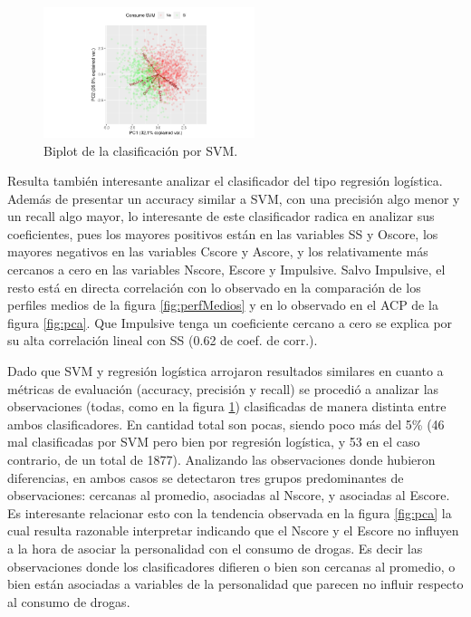 \documentclass[a4paper,twocolumn]{article}
\begin{document}
\begin{figure}[h]
	\centering
	\includegraphics[trim={4cm 0.2cm 2cm 0.5cm}, clip=true, width=0.55\textwidth]{svm.png}
	\caption{Biplot de la clasificación por SVM.}
	\label{fig:svm}
\end{figure}

Resulta también interesante analizar el clasificador del tipo regresión logística. Además de presentar un accuracy similar a SVM, con una precisión algo menor y un recall algo mayor, lo interesante de este clasificador radica en analizar sus coeficientes, pues los mayores positivos están en las variables SS y Oscore, los mayores negativos en las variables Cscore y Ascore, y los relativamente más cercanos a cero en las variables Nscore, Escore y Impulsive. Salvo Impulsive, el resto está en directa correlación con lo observado en la comparación de los perfiles medios de la figura \ref{fig:perfMedios} y en lo observado en el ACP de la figura \ref{fig:pca}. Que Impulsive tenga un coeficiente cercano a cero se explica por su alta correlación lineal con SS (0.62 de coef. de corr.).

Dado que SVM y regresión logística arrojaron resultados similares en cuanto a métricas de evaluación (accuracy, precisión y recall) se procedió a analizar las observaciones (todas, como en la figura \ref{fig:svm}) clasificadas de manera distinta entre ambos clasificadores. En cantidad total son pocas, siendo poco más del 5\% (46 mal clasificadas por SVM pero bien por regresión logística, y 53 en el caso contrario, de un total de 1877). Analizando las observaciones donde hubieron diferencias, en ambos casos se detectaron tres grupos predominantes de observaciones: cercanas al promedio, asociadas al Nscore, y asociadas al Escore. Es interesante relacionar esto con la tendencia observada en la figura \ref{fig:pca} la cual resulta razonable interpretar indicando que el Nscore y el Escore no influyen a la hora de asociar la personalidad con el consumo de drogas. Es decir las observaciones donde los clasificadores difieren o bien son cercanas al promedio, o bien están asociadas a variables de la personalidad que parecen no influir respecto al consumo de drogas.
\end{document}
